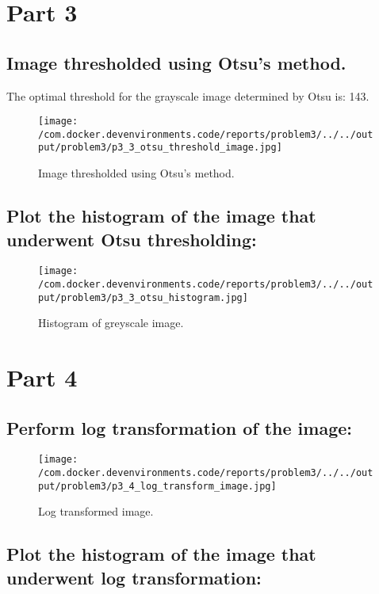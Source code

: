 \documentclass{article}%
\begin{document}
%
\section{Part 3}%
\label{sec:Part3}%
\subsection{Image thresholded using Otsu's method.}%
\label{subsec:ImagethresholdedusingOtsusmethod.}%
The optimal threshold for the grayscale image determined by Otsu is: 143.%


\begin{figure}[h!]%
\centering%
\texttt{[image: /com.docker.devenvironments.code/reports/problem3/../../output/problem3/p3\_3\_otsu\_threshold\_image.jpg]}%
\caption{Image thresholded using Otsu's method.}%
\end{figure}

%
\newpage%
\subsection{Plot the histogram of the image that underwent Otsu thresholding:}%
\label{subsec:PlotthehistogramoftheimagethatunderwentOtsuthresholding}%


\begin{figure}[h!]%
\centering%
\texttt{[image: /com.docker.devenvironments.code/reports/problem3/../../output/problem3/p3\_3\_otsu\_histogram.jpg]}%
\caption{Histogram of greyscale image.}%
\end{figure}

%
\section{Part 4}%
\label{sec:Part4}%
\subsection{Perform log transformation of the image:}%
\label{subsec:Performlogtransformationoftheimage}%


\begin{figure}[h!]%
\centering%
\texttt{[image: /com.docker.devenvironments.code/reports/problem3/../../output/problem3/p3\_4\_log\_transform\_image.jpg]}%
\caption{Log transformed image.}%
\end{figure}

%
\subsection{Plot the histogram of the image that underwent log transformation:}%
\label{subsec:Plotthehistogramoftheimagethatunderwentlogtransformation}%
\end{document}
